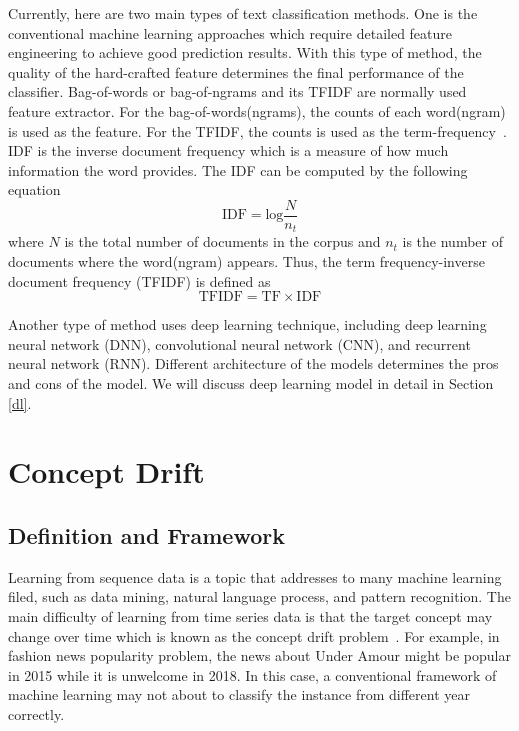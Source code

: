 Currently, here are two main types of text classification methods. One is the conventional machine learning approaches which require detailed feature engineering to achieve good prediction results. With this type of method, the quality of the hard-crafted feature determines the final performance of the classifier. Bag-of-words or bag-of-ngrams and its TFIDF are normally used feature extractor. For the bag-of-words(ngrams), the counts of each word(ngram) is used as the feature. For the TFIDF, the counts is used as the term-frequency~\cite{sparck1972statistical}. IDF is the inverse document frequency which is a measure of how much information the word provides. The IDF can be computed by the following equation
\begin{equation}
\mbox{IDF} = \mbox{log} \frac{N}{n_t}
\end{equation}
where $N$ is the total number of documents in the corpus and $n_t$ is the number of documents where the word(ngram) appears. Thus, the term frequency-inverse document frequency (TFIDF) is defined as
\begin{equation}
\mbox{TFIDF} = \mbox{TF} \times \mbox{IDF}
\end{equation}

Another type of method uses deep learning technique, including deep learning neural network (DNN), convolutional neural network (CNN), and recurrent neural network (RNN). Different architecture of the models determines the pros and cons of the model. We will discuss deep learning model in detail in Section \ref{dl}.



\section{Concept Drift}
\subsection{Definition and Framework}
Learning from sequence data is a topic that addresses to many machine learning filed, such as data mining, natural language process, and pattern recognition. The main difficulty of learning from time series data is that the target concept may change over time which is known as the concept drift problem~\cite{Goncalves2014}. For example, in fashion news popularity problem, the news about Under Amour might be popular in 2015 while it is unwelcome in 2018. In this case, a conventional framework of machine learning may not about to classify the instance from different year correctly.

